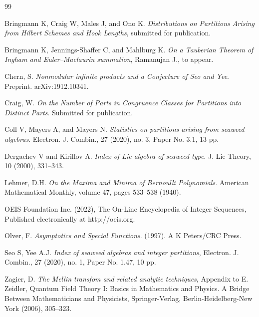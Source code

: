 \documentclass[11pt,reqno]{amsart}
\theoremstyle{definition}
\theoremstyle{plain}
\theoremstyle{named}
\numberwithin{equation}{section}
\theoremstyle{example}
\begin{document}
\begin{thebibliography}{99}

 Bringmann K, Craig W, Males J, and Ono K. \emph{Distributions on Partitions Arising from Hilbert Schemes and Hook Lengths}, submitted for publication.

 Bringmann K, Jennings-Shaffer C, and Mahlburg K. \emph{On a Tauberian Theorem of Ingham and Euler--Maclaurin summation}, Ramanujan J., to appear.

 Chern, S. \emph{Nonmodular infinite products and a Conjecture of Seo and Yee}. Preprint. arXiv:1912.10341.

 Craig, W. \emph{On the Number of Parts in Congruence Classes for Partitions into Distinct Parts}. Submitted for publication.

 Coll V, Mayers A, and Mayers N. \emph{Statistics on partitions arising from seaweed algebras}. Electron. J. Combin., 27 (2020), no. 3, Paper No. 3.1, 13 pp.

 Dergachev V and Kirillov A. \emph{Index of Lie algebra of seaweed type}. J. Lie Theory, 10 (2000), 331–343.

 Lehmer, D.H. \emph{On the Maxima and Minima of Bernoulli Polynomials}. American Mathematical Monthly, volume 47, pages 533–538 (1940).

 OEIS Foundation Inc. (2022), The On-Line Encyclopedia of Integer Sequences, Published electronically at http://oeis.org.

 Olver, F. {\it Asymptotics and Special Functions}. (1997). A K Peters/CRC Press.

 Seo S, Yee A.J. \emph{Index of seaweed algebras and integer partitions}, Electron. J. Combin., 27 (2020), no. 1, Paper No. 1.47, 10 pp.

 Zagier, D. \textit{The Mellin transfom and related analytic techniques}, Appendix to E. Zeidler, Quantum Field Theory I:
Basics in Mathematics and Physics. A Bridge Between Mathematicians and Physicists, Springer-Verlag, Berlin-Heidelberg-New York (2006), 305--323.

\end{thebibliography}
\end{document}
